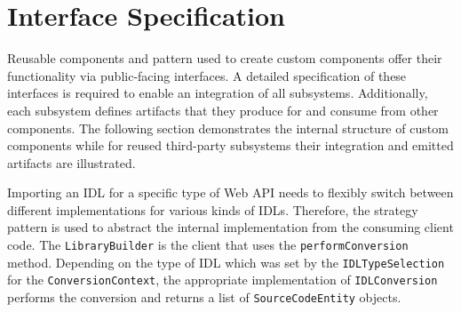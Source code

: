 \section{Interface Specification}
\label{sec:InterfaceSpecification}

Reusable components and pattern used to create custom components offer their functionality via public-facing interfaces. A detailed specification of these interfaces is required to enable an integration of all subsystems. Additionally, each subsystem defines artifacts that they produce for and consume from other components. The following section demonstrates the internal structure of custom components while for reused third-party subsystems their integration and emitted artifacts are illustrated.

\begin{figure}[!h]
\end{figure}

Importing an \ac{IDL} for a specific type of Web API needs to flexibly switch between different implementations for various kinds of \acp{IDL}. Therefore, the strategy pattern is used to abstract the internal implementation from the consuming client code. The \texttt{LibraryBuilder} is the client that uses the \texttt{performConversion} method. Depending on the type of IDL which was set by the \texttt{IDL\-Type\-Selec\-tion} for the \texttt{ConversionContext}, the appropriate implementation of \texttt{IDL\-Con\-ver\-sion} performs the conversion and returns a list of \texttt{SourceCodeEntity} objects. 

\begin{figure}[!h]
\end{figure}

